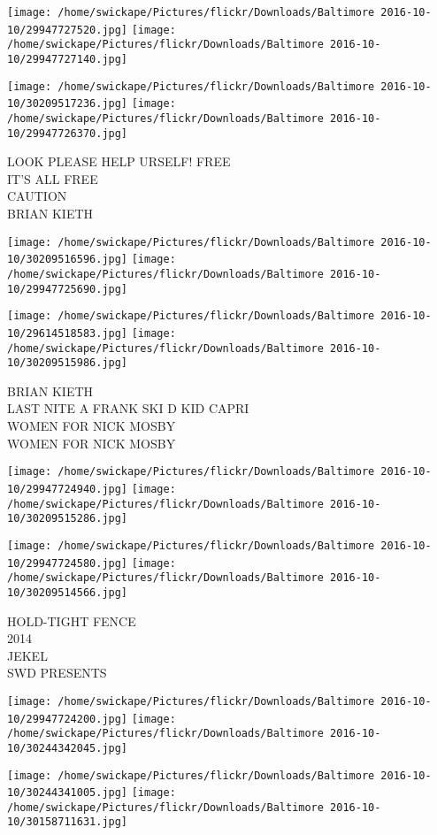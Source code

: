 \documentclass[10pt,letterpaper]{article}
\begin{document}
\texttt{[image: /home/swickape/Pictures/flickr/Downloads/Baltimore 2016-10-10/29947727520.jpg]}
\texttt{[image: /home/swickape/Pictures/flickr/Downloads/Baltimore 2016-10-10/29947727140.jpg]}

\texttt{[image: /home/swickape/Pictures/flickr/Downloads/Baltimore 2016-10-10/30209517236.jpg]}
\texttt{[image: /home/swickape/Pictures/flickr/Downloads/Baltimore 2016-10-10/29947726370.jpg]}

LOOK PLEASE HELP URSELF!  FREE\\
IT'S ALL FREE\\
CAUTION\\
BRIAN KIETH
\pagebreak

\texttt{[image: /home/swickape/Pictures/flickr/Downloads/Baltimore 2016-10-10/30209516596.jpg]}
\texttt{[image: /home/swickape/Pictures/flickr/Downloads/Baltimore 2016-10-10/29947725690.jpg]}

\texttt{[image: /home/swickape/Pictures/flickr/Downloads/Baltimore 2016-10-10/29614518583.jpg]}
\texttt{[image: /home/swickape/Pictures/flickr/Downloads/Baltimore 2016-10-10/30209515986.jpg]}

BRIAN KIETH\\
LAST NITE A FRANK SKI D KID CAPRI\\
WOMEN FOR NICK MOSBY\\
WOMEN FOR NICK MOSBY
\pagebreak

\texttt{[image: /home/swickape/Pictures/flickr/Downloads/Baltimore 2016-10-10/29947724940.jpg]}
\texttt{[image: /home/swickape/Pictures/flickr/Downloads/Baltimore 2016-10-10/30209515286.jpg]}

\texttt{[image: /home/swickape/Pictures/flickr/Downloads/Baltimore 2016-10-10/29947724580.jpg]}
\texttt{[image: /home/swickape/Pictures/flickr/Downloads/Baltimore 2016-10-10/30209514566.jpg]}

HOLD{-}TIGHT FENCE\\
2014\\
JEKEL\\
SWD PRESENTS
\pagebreak

\texttt{[image: /home/swickape/Pictures/flickr/Downloads/Baltimore 2016-10-10/29947724200.jpg]}
\texttt{[image: /home/swickape/Pictures/flickr/Downloads/Baltimore 2016-10-10/30244342045.jpg]}

\texttt{[image: /home/swickape/Pictures/flickr/Downloads/Baltimore 2016-10-10/30244341005.jpg]}
\texttt{[image: /home/swickape/Pictures/flickr/Downloads/Baltimore 2016-10-10/30158711631.jpg]}
\end{document}
